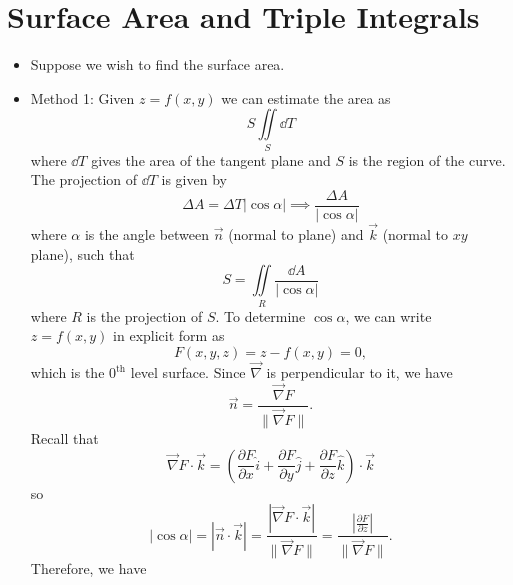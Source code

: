\section{Surface Area and Triple Integrals}
\begin{itemize}
    \item Suppose we wish to find the surface area.
    \item Method 1: Given $z=f(x,y)$ we can estimate the area as
          \begin{equation}
              S \iint\limits_{S}\dd{T}
          \end{equation}
          where $\dd{T}$ gives the area of the tangent plane and $S$ is the region of the curve. The projection of $\dd{T}$ is given by
          \begin{equation}
              \Delta A = \Delta T |\cos\alpha | \implies \frac{\Delta A}{|\cos\alpha|}
          \end{equation}
          where $\alpha$ is the angle between $\vec{n}$ (normal to plane) and $\vec{k}$ (normal to $xy$ plane), such that
          \begin{equation}
              S = \iint\limits_R \frac{\dd{A}}{|\cos\alpha|}
          \end{equation}
          where $R$ is the projection of $S$. To determine $\cos\alpha$, we can write $z=f(x,y)$ in explicit form as
          \begin{equation}
              F(x,y,z) = z-f(x,y) = 0,
          \end{equation}
          which is the $0^\text{th}$ level surface. Since $\vec{\nabla}$ is perpendicular to it, we have
          \begin{equation}
              \vec{n} = \frac{\vec{\nabla} F}{\lVert \vec{\nabla} F \rVert}.
          \end{equation}
          Recall that
          \begin{equation}
              \vec{\nabla} F \cdot \vec{k} = \left(\frac{\partial F}{\partial x}\hat{i} + \frac{\partial F}{\partial y}\hat{j}+\frac{\partial F}{\partial z}\hat{k}\right)\cdot \vec{k}
          \end{equation}
          so
          \begin{equation}
              \boxed{|\cos \alpha| = |\vec{n}\cdot \vec{k}| = \frac{|\vec{\nabla} F \cdot \vec{k}|}{\lVert \vec{\nabla} F\rVert} = \frac{\left|\frac{\partial F}{\partial z}\right|}{\lVert \vec{\nabla} F\rVert}}.
          \end{equation}
          Therefore, we have

\end{itemize}
